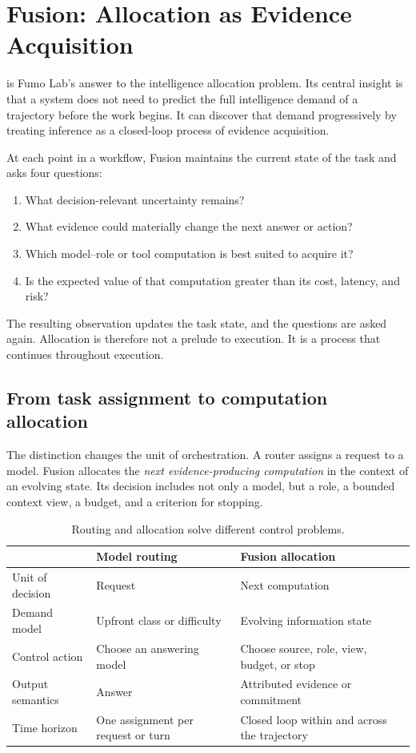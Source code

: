 \section{Fusion: Allocation as Evidence Acquisition}

\systemname is Fumo Lab's answer to the intelligence allocation problem. Its
central insight is that a system does not need to predict the full intelligence
demand of a trajectory before the work begins. It can discover that demand
progressively by treating inference as a closed-loop process of evidence
acquisition.

At each point in a workflow, Fusion maintains the current state of the task and
asks four questions:

\begin{enumerate}
  \item What decision-relevant uncertainty remains?
  \item What evidence could materially change the next answer or action?
  \item Which model--role or tool computation is best suited to acquire it?
  \item Is the expected value of that computation greater than its cost,
  latency, and risk?
\end{enumerate}

The resulting observation updates the task state, and the questions are asked
again. Allocation is therefore not a prelude to execution. It is a process that
continues throughout execution.

\subsection{From task assignment to computation allocation}

The distinction changes the unit of orchestration. A router assigns a request
to a model. Fusion allocates the \emph{next evidence-producing computation} in
the context of an evolving state. Its decision includes not only a model, but a
role, a bounded context view, a budget, and a criterion for stopping.

\begin{table}[H]
\centering
\caption{Routing and allocation solve different control problems.}
\small
\begin{tabular}{@{}p{}p{}p{}@{}}
\toprule
 & Model routing & Fusion allocation \\
\midrule
Unit of decision & Request & Next computation \\
Demand model & Upfront class or difficulty & Evolving information state \\
Control action & Choose an answering model & Choose source, role, view, budget, or stop \\
Output semantics & Answer & Attributed evidence or commitment \\
Time horizon & One assignment per request or turn & Closed loop within and across the trajectory \\
\bottomrule
\end{tabular}
\end{table}

